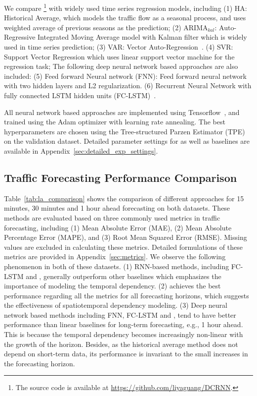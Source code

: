 \begin{table}[tbp]
{\begin{tabular}{c||c|c|cccccccc}
\bottomrule

\end{tabular}
}
\end{table}

We compare \gcrnn{}\footnote{The source code is available at \url{https://github.com/liyaguang/DCRNN}.} with widely used time series regression models, including
(1) HA: Historical Average, which models the traffic flow as a seasonal process, and uses weighted average of previous seasons as the prediction;
(2) ARIMA$_{kal}$: Auto-Regressive Integrated Moving Average model with Kalman filter which is widely used in time series prediction; 
(3) VAR: Vector Auto-Regression~\citep{hamilton1994time}.
(4) SVR: Support Vector Regression which uses linear support vector machine for the regression task; 
The following deep neural network based approaches are also included:
(5) Feed forward Neural network (FNN): Feed forward neural network with two hidden layers and L2 regularization.
(6) Recurrent Neural Network with fully connected LSTM hidden units (FC-LSTM)~\citep{sutskever2014sequence}.

All neural network based approaches are implemented using Tensorflow~\citep{abadi2016tensorflow}, and trained using the Adam optimizer with learning rate annealing.
The best hyperparameters are chosen using the Tree-structured Parzen Estimator (TPE)~\citep{bergstra2011algorithms} on the validation dataset. 
Detailed parameter settings for \gcrnn{} as well as baselines are available in Appendix~\ref{sec:detailed_exp_settings}.


\vspace{-0.1in}
\subsection{Traffic Forecasting Performance Comparison}
Table~\ref{tab:la_comparison} shows the comparison of different approaches for 15 minutes, 30 minutes and 1 hour ahead forecasting on both datasets.
These methods are evaluated based on three commonly used metrics in traffic forecasting, including
(1)  Mean Absolute Error (MAE), (2) Mean Absolute Percentage Error (MAPE),  and (3) Root Mean Squared Error (RMSE).
Missing values are excluded in calculating these metrics. Detailed formulations of these metrics are provided in Appendix~\ref{sec:metrics}.
We observe the following phenomenon in both of these datasets.
(1) RNN-based methods, including FC-LSTM and \gcrnn{}, generally outperform other baselines which emphasizes the importance of modeling the temporal dependency.  
(2) \gcrnn{} achieves the best performance regarding all the metrics for all forecasting horizons, which suggests the effectiveness of spatiotemporal dependency modeling.
(3) Deep neural network based methods including FNN, FC-LSTM and \gcrnn{}, tend to have better performance than linear baselines for long-term forecasting, e.g., 1 hour ahead.  This is because the temporal dependency becomes increasingly non-linear with the growth of the horizon. 
Besides, as the historical average method does not depend on short-term data, its performance is invariant to the small increases in the forecasting horizon.

